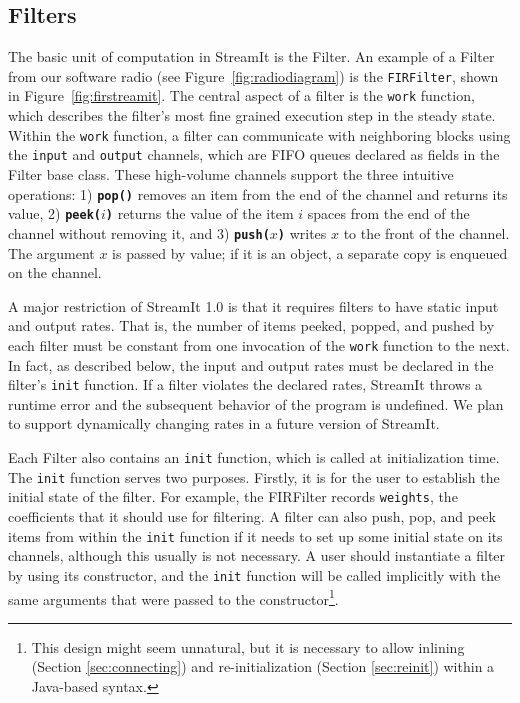 \subsection{Filters}

The basic unit of computation in StreamIt is the Filter.  An example of
a Filter from our software radio (see Figure~\ref{fig:radiodiagram}) is
the {\tt FIRFilter}, shown in Figure~\ref{fig:firstreamit}.  The central
aspect of a filter is the {\tt work} function, which describes the
filter's most fine grained execution step in the steady state.  Within
the {\tt work} function, a filter can communicate with neighboring
blocks using the {\tt input} and {\tt output} channels, which are FIFO
queues declared as fields in the Filter base class.  These high-volume
channels support the three intuitive operations: 1) {\bf {\tt pop()}}
removes an item from the end of the channel and returns its value, 2)
{\bf {\tt peek($i$)}} returns the value of the item $i$ spaces from the
end of the channel without removing it, and 3) {\bf {\tt push($x$)}}
writes $x$ to the front of the channel.  The argument $x$ is passed by
value; if it is an object, a separate copy is enqueued on the channel.

A major restriction of StreamIt 1.0 is that it requires filters to have
static input and output rates.  That is, the number of items peeked,
popped, and pushed by each filter must be constant from one invocation
of the {\tt work} function to the next.  In fact, as described below,
the input and output rates must be declared in the filter's {\tt init}
function.  If a filter violates the declared rates, StreamIt throws a
runtime error and the subsequent behavior of the program is
undefined. We plan to support dynamically changing rates in a future
version of StreamIt.

Each Filter also contains an {\tt init} function, which is called at
initialization time.  The {\tt init} function serves two purposes.
Firstly, it is for the user to establish the initial state of the
filter.  For example, the FIRFilter records {\tt weights}, the
coefficients that it should use for filtering.  A filter can also push,
pop, and peek items from within the {\tt init} function if it needs to
set up some initial state on its channels, although this usually is not
necessary.  A user should instantiate a filter by using its constructor,
and the {\tt init} function will be called implicitly with the same
arguments that were passed to the constructor{\footnote{This design
might seem unnatural, but it is necessary to allow inlining (Section
\ref{sec:connecting}) and re-initialization (Section \ref{sec:reinit})
within a Java-based syntax.}}.

